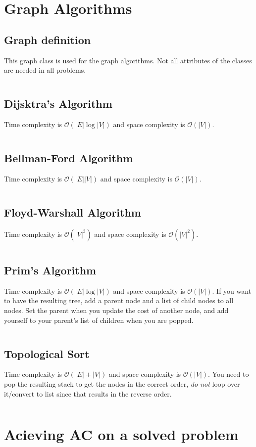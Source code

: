 \documentclass[8pt,a4paper,landscape,oneside]{amsart}
\newcommand{\code}[1]{\inputminted[fontsize=\normalsize,baselinestretch=1]{java}{code/#1}}
\newcommand{\bigO}{\mathcal{O}}
\begin{document}
\begin{multicols*}{3}
\section{Graph Algorithms}
  \subsection{Graph definition}
  This graph class is used for the graph algorithms. Not all attributes of the classes are needed in all problems.
  \code{Graphs/Graph.java}  
  \subsection{Dijsktra's Algorithm}
  Time complexity is $\bigO(|E| \log{|V|})$ and space complexity is $\bigO(|V|)$.
  \code{Graphs/Dijkstras.java}
  \subsection{Bellman-Ford Algorithm}
  Time complexity is $\bigO(|E||V|)$ and space complexity is $\bigO(|V|)$.
  \code{Graphs/BellmanFord.java}
  \subsection{Floyd-Warshall Algorithm}
  Time complexity is $\bigO(|V|^3)$ and space complexity is $\bigO(|V|^2)$.
  \code{Graphs/FloydWarshall.java}
  \subsection{Prim's Algorithm}
  Time complexity is $\bigO(|E| \log{|V|})$ and space complexity is $\bigO(|V|)$. If you want to have the resulting tree, add a parent node and a list of child nodes to all nodes. Set the parent when you update the cost of another node, and add yourself to your parent's list of children when you are popped.
  \code{Graphs/MST.java}
  \subsection{Topological Sort}
  Time complexity is $\bigO(|E| + |V|)$ and space complexity is $\bigO(|V|)$. You need to pop the resulting stack to get the nodes in the correct order, \textit{do not} loop over it/convert to list since that results in the reverse order.
  \code{Graphs/TopologicalSort.java}
        
\section{Acieving AC on a solved problem}

\end{multicols*}
\end{document}
